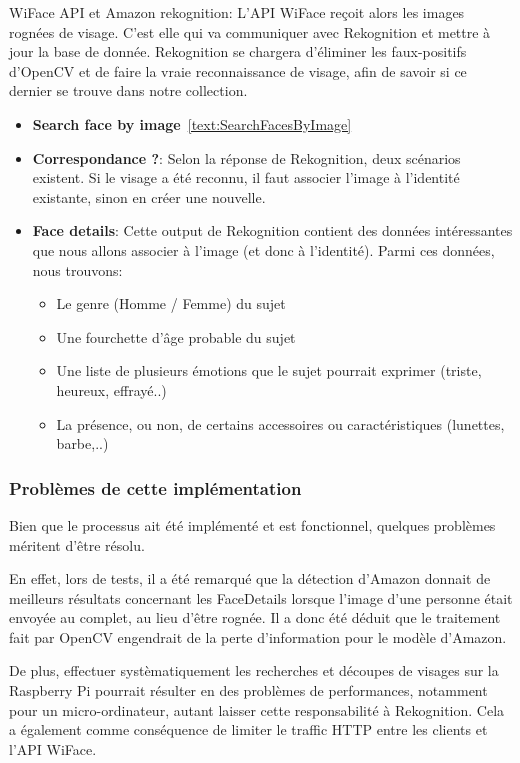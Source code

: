 WiFace API et Amazon rekognition:
L'API WiFace reçoit alors les images rognées de visage. 
C'est elle qui va communiquer avec Rekognition et mettre à jour la base de donnée.
Rekognition se chargera d'éliminer les faux-positifs d'OpenCV et de faire la vraie reconnaissance de visage,
afin de savoir si ce dernier se trouve dans notre collection.
\begin{itemize}
    \item \textbf{Search face by image}~\ref{text:SearchFacesByImage}
    \item \textbf{Correspondance ?}: Selon la réponse de Rekognition, deux scénarios existent. Si le visage a été reconnu, il faut associer l'image à l'identité existante, sinon en créer une nouvelle.
    \item \textbf{Face details}: Cette output de Rekognition contient des données intéressantes que nous allons associer à l'image (et donc à l'identité). Parmi ces données, nous trouvons:
    \begin{itemize}
        \item Le genre (Homme / Femme) du sujet
        \item Une fourchette d'âge probable du sujet
        \item Une liste de plusieurs émotions que le sujet pourrait exprimer (triste, heureux, effrayé..)
        \item La présence, ou non, de certains accessoires ou caractéristiques (lunettes, barbe,..)
    \end{itemize} 
\end{itemize} 

\subsubsection{Problèmes de cette implémentation}\label{sec:probleme_workflow}
Bien que le processus ait été implémenté et est fonctionnel,
quelques problèmes méritent d'être résolu.

En effet, lors de tests, il a été remarqué que la détection d'Amazon
donnait de meilleurs résultats concernant les FaceDetails lorsque l'image d'une personne
était envoyée au complet, au lieu d'être rognée. Il a donc été déduit que le traitement fait par OpenCV engendrait de la perte
d'information pour le modèle d'Amazon.

De plus, effectuer systèmatiquement les recherches et découpes de visages sur la Raspberry Pi pourrait résulter en des problèmes de
performances, notamment pour un micro-ordinateur, autant laisser cette responsabilité à Rekognition. Cela a également comme conséquence de limiter
le traffic HTTP entre les clients et l'API WiFace.

